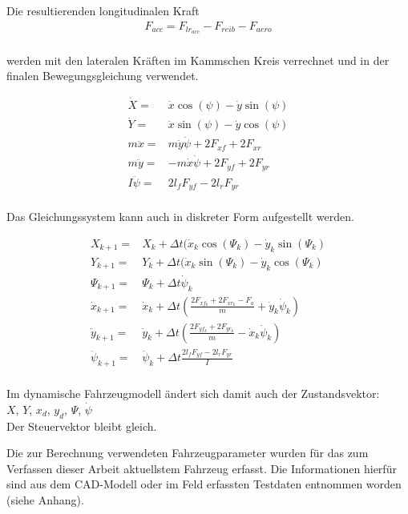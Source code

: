 \documentclass{like}
\begin{document}
Die resultierenden longitudinalen Kraft 
\begin{eqnarray}
F_{acc} = F_{lr_{acc}} - F_{reib} - F_{aero}\\
\end{eqnarray}

werden mit den lateralen Kräften im Kammschen Kreis verrechnet und in der finalen Bewegungsgleichung verwendet.

\begin{eqnarray}
\dot{X} =& \dot{x} \cos(\psi) - \dot{y} \sin(\psi) \\
\dot{Y} =& \dot{x} \sin(\psi) - \dot{y} \cos(\psi) \\
m \ddot{x} =& m \dot{y} \dot{\psi} + 2F_{xf} + 2 F_{xr}\\
m \ddot{y} =& - m \dot{x} \dot{\psi} + 2 F_{yf} + 2 F_{yr} \\
I \ddot{\psi} =& 2 l_f F_{yf} - 2 l_r F_{yr} \\
\end{eqnarray}

Das Gleichungssystem kann auch in diskreter Form aufgestellt werden.

\begin{eqnarray}
X_{k+1} =& X_k + \Delta t(\dot{x}_k \cos(\Psi_k) - \dot{y}_k \sin(\Psi_k) \\
Y_{k+1} =& Y_{k} + \Delta t(\dot{x}_k \sin(\Psi_k) - \dot{y}_k \cos(\Psi_k) \\
\Psi_{k+1} =& \Psi_k + \Delta t \dot{\psi}_k \\
\dot{x}_{k+1} =&  \dot{x}_k + \Delta t (\frac{2F_{xf_k} + 2 F_{xr_k}- F_a}{m} + \dot{y}_k \dot{\psi}_k) \\
\dot{y}_{k+1} =&  \dot{y}_k + \Delta t (\frac{2 F_{yf_k} + 2 F_{yr_k}}{m} - \dot{x}_k \dot{\psi}_k)  \\
\dot{\psi}_{k+1} =& \dot{\psi}_k + \Delta t \frac{2 l_f F_{yf} - 2 l_r F_{yr}}{I} \\
\end{eqnarray}

Im dynamische Fahrzeugmodell ändert sich damit auch der Zustandsvektor: \\
\(X\), \(Y\), \(x_d\), \(y_d\), \(\Psi\), \(\dot{\psi}\) \\
Der Steuervektor bleibt gleich.

Die zur Berechnung verwendeten Fahrzeugparameter wurden für das zum Verfassen dieser Arbeit aktuellstem Fahrzeug erfasst. Die Informationen hierfür sind aus dem CAD-Modell oder im Feld erfassten Testdaten entnommen worden (siehe Anhang).
\end{document}
